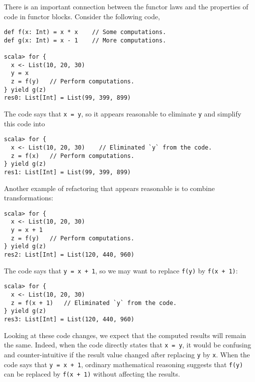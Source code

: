 There is an important connection between the functor laws and the
properties of code in functor blocks. Consider the following code,
\begin{lstlisting}
def f(x: Int) = x * x    // Some computations.
def g(x: Int) = x - 1    // More computations.

scala> for {
  x <- List(10, 20, 30)
  y = x
  z = f(y)   // Perform computations.
} yield g(z)
res0: List[Int] = List(99, 399, 899)
\end{lstlisting}
The code says that \lstinline!x = y!, so it appears reasonable to
eliminate \lstinline!y! and simplify this code into
\begin{lstlisting}
scala> for {
  x <- List(10, 20, 30)    // Eliminated `y` from the code.
  z = f(x)   // Perform computations.
} yield g(z)
res1: List[Int] = List(99, 399, 899)
\end{lstlisting}
Another example of refactoring that appears reasonable is to combine
transformations:
\begin{lstlisting}
scala> for {
  x <- List(10, 20, 30)
  y = x + 1
  z = f(y)   // Perform computations.
} yield g(z)
res2: List[Int] = List(120, 440, 960) 
\end{lstlisting}
The code says that \lstinline!y = x + 1!, so we may want to replace
\lstinline!f(y)! by \lstinline!f(x + 1)!:
\begin{lstlisting}
scala> for {
  x <- List(10, 20, 30)
  z = f(x + 1)   // Eliminated `y` from the code.
} yield g(z)
res3: List[Int] = List(120, 440, 960) 
\end{lstlisting}
Looking at these code changes, we expect that the computed results
will remain the same. Indeed, when the code directly states that \lstinline!x = y!,
it would be confusing and counter-intuitive if the result value changed
after replacing \lstinline!y! by \lstinline!x!. When the code says
that \lstinline!y = x + 1!, ordinary mathematical reasoning suggests
that \lstinline!f(y)! can be replaced by \lstinline!f(x + 1)! without
affecting the results.

